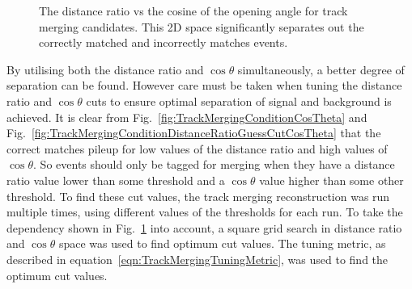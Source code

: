 \begin{figure}[b!]
  \centering
  \caption{The distance ratio vs the cosine of the opening angle for track merging candidates.  This 2D space significantly separates out the correctly matched and incorrectly matches events.}
  \label{fig:TrackMergingConditionDistanceRatioVsCosTheta}
\end{figure}
\newline
\newline
By utilising both the distance ratio and $\cos\theta$ simultaneously, a better degree of separation can be found.  However care must be taken when tuning the distance ratio and $\cos\theta$ cuts to ensure optimal separation of signal and background is achieved.  It is clear from Fig.~\ref{fig:TrackMergingConditionCosTheta} and Fig.~\ref{fig:TrackMergingConditionDistanceRatioGuessCutCosTheta} that the correct matches pileup for low values of the distance ratio and high values of $\cos\theta$.  So events should only be tagged for merging when they have a distance ratio value lower than some threshold and a $\cos\theta$ value higher than some other threshold. To find these cut values, the track merging reconstruction was run multiple times, using different values of the thresholds for each run.  To take the dependency shown in Fig.~\ref{fig:TrackMergingConditionDistanceRatioVsCosTheta} into account, a square grid search in distance ratio and $\cos\theta$ space was used to find optimum cut values.  The tuning metric, as described in equation~\ref{eqn:TrackMergingTuningMetric}, was used to find the optimum cut values.
